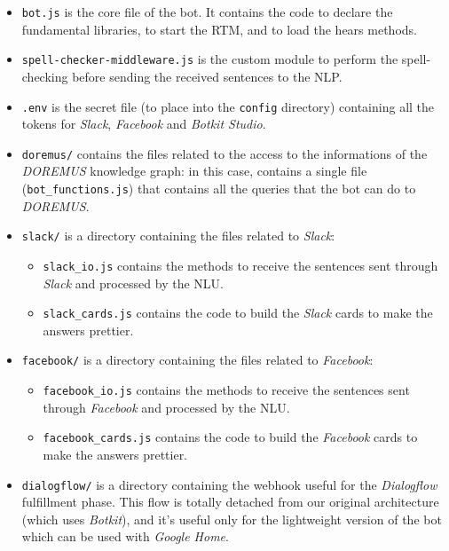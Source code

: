 \documentclass[a4paper,12pt]{report}
\begin{document}
	\begin{itemize}
		\item \texttt{bot.js} is the core file of the bot. It contains the code to declare the fundamental libraries, to start the RTM, and to load the hears methods.
		
		\item \texttt{spell-checker-middleware.js} is the custom module to perform the spell-checking before sending the received sentences to the NLP.
		
		\item \texttt{.env} is the secret file (to place into the \texttt{config} directory) containing all the tokens for \textit{Slack}, \textit{Facebook} and \textit{Botkit Studio}.
		
		\item \texttt{doremus/} contains the files related to the access to the informations of the \textit{DOREMUS} knowledge graph: in this case, contains a single file (\texttt{bot\_functions.js}) that contains all the queries that the bot can do to \textit{DOREMUS}.
		
		\item \texttt{slack/} is a directory containing the files related to \textit{Slack}:
			\begin{itemize}
			\item \texttt{slack\_io.js} contains the methods to receive the sentences sent through \textit{Slack} and processed by the NLU.
			
			\item \texttt{slack\_cards.js} contains the code to build the \textit{Slack} cards to make the answers prettier.
			\end{itemize}
		\item \texttt{facebook/} is a directory containing the files related to \textit{Facebook}:
			\begin{itemize}
			\item \texttt{facebook\_io.js} contains the methods to receive the sentences sent through \textit{Facebook} and processed by the NLU.
			
			\item \texttt{facebook\_cards.js} contains the code to build the \textit{Facebook} cards to make the answers prettier.
			\end{itemize}
		\item \texttt{dialogflow/} is a directory containing the webhook useful for the \textit{Dialogflow} fulfillment phase. This flow is totally detached from our original architecture (which uses \textit{Botkit}), and it's useful only for the lightweight version of the bot which can be used with \textit{Google Home}.
	\end{itemize}
	
\end{document}
